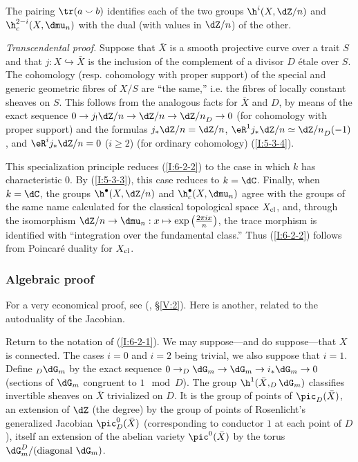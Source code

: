 \documentclass[oneside]{book}
\begin{document}
\begin{theorem}\label{I:6-2-2}
The pairing $\tr(a\smallsmile b)$ identifies each of the two groups
$\h^i(X,\dZ/n)$ and $\h_c^{2-i}(X,\dmu_n)$ with the dual (with values
in $\dZ/n$) of the other.
\end{theorem}

\emph{Transcendental proof.} Suppose that $\bar X$ is a smooth projective
curve over a trait $S$ and that $j:X\hookrightarrow\bar X$ is the
inclusion of the complement of a divisor $D$ étale over $S$. The
cohomology (resp. cohomology with proper support) of the special and
generic geometric fibres of $X/S$ are “the same,” i.e. the fibres of
locally constant sheaves on $S$. This follows from the analogous facts
for $\bar X$ and $D$, by means of the exact sequence
$0\to j_!\dZ/n\to\dZ/n\to{\dZ/n}_D\to0$ (for cohomology with proper
support) and the formulas $j_*\dZ/n=\dZ/n$,
$\eR^1j_*\dZ/n\simeq{\dZ/n}_D(-1)$, and
$\eR^ij_*\dZ/n=0$ ($i\geqslant2$) (for ordinary cohomology)
(\ref{I:5-3-4}).

This specialization principle reduces (\ref{I:6-2-2}) to the case in
which $k$ has characteristic $0$. By (\ref{I:5-3-3}), this case reduces
to $k=\dC$. Finally, when $k=\dC$, the groups
$\h^\bullet(X,\dZ/n)$ and $\h_c^\bullet(X,\dmu_n)$ agree with the
groups of the same name calculated for the classical topological space
$X_{\textnormal{cl}}$, and, through the isomorphism
$\dZ/n\to\dmu_n:x\mapsto\exp\left(\frac{2\pi ix}{n}\right)$, the trace
morphism is identified with “integration over the fundamental class.”
Thus (\ref{I:6-2-2}) follows from Poincaré duality for
$X_{\textnormal{cl}}$.

\subsubsection{Algebraic proof}\label{I:6-2-3}

For a very economical proof, see (, \S\ref{V:2}).
Here is another, related to the autoduality of the Jacobian.

Return to the notation of (\ref{I:6-2-1}). We may suppose---and do
suppose---that $X$ is connected. The cases $i=0$ and $i=2$ being
trivial, we also suppose that $i=1$. Define $_D\dG_m$ by the exact
sequence $0\to_D\dG_m\to\dG_m\to i_*\dG_m\to0$ (sections of $\dG_m$
congruent to $1\mod D$). The group $\h^1(\bar X,_D\dG_m)$ classifies
invertible sheaves on $\bar X$ trivialized on $D$. It is the group of
points of $\pic_D(\bar X)$, an extension of $\dZ$ (the degree) by the
group of points of Rosenlicht's generalized Jacobian
$\pic_D^0(\bar X)$ (corresponding to conductor $1$ at each point of
$D$), itself an extension of the abelian variety $\pic^0(\bar X)$ by
the torus $\dG_m^D/(\text{diagonal $\dG_m$})$.
\end{document}
